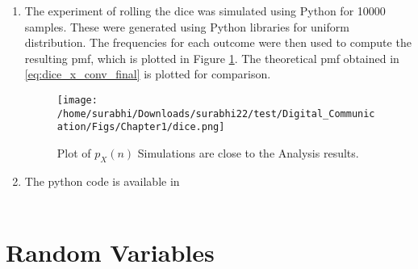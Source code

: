 \documentclass[journal,10pt,twocolumn]{IEEEtran}
\newcounter{Chapcounter}
\numberwithin{equation}{subsection}
\numberwithin{figure}{subsection}
\renewcommand\thesection{\theChapcounter.\arabic{section}}
\renewcommand\thesection{\arabic{section}}
\renewcommand\thesubsection{\thesection.\arabic{subsection}}
\begin{document}
\begin{enumerate}[label=\thesubsection.\arabic*.,ref=\thesubsection.\arabic{figure}]
\item 
The experiment of rolling the dice was simulated using Python for 10000 samples.  These were generated using Python libraries for uniform distribution. The frequencies for each outcome were then used to compute the resulting pmf, which  is plotted in Figure \ref{fig:dice}.  The theoretical pmf obtained in \eqref{eq:dice_x_conv_final} is plotted for comparison.
\begin{figure}[!ht]
\centering
\texttt{[image: /home/surabhi/Downloads/surabhi22/test/Digital\_Communication/Figs/Chapter1/dice.png]} 
\caption{Plot of $p_X(n)$ Simulations are close to the Analysis results. }
\label{fig:dice}
\end{figure}

\item The python code is available in\\
\
\end{enumerate}


\section{Random Variables}
\end{document}
